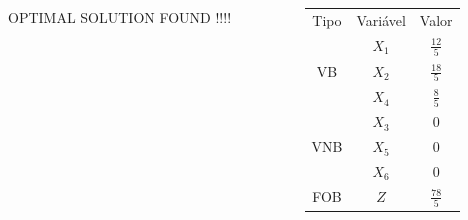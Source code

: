 \documentclass{beamer}
\begin{document}
\begin{frame}
{\begin{columns}
\begin{column}{5cm}
			\end{column}
		\end{columns}
	}	
	{
		\begin{columns}
			\begin{column}{5cm}
				\begin{mdframed}[backgroundcolor=red!80]
					\centering
					OPTIMAL SOLUTION FOUND !!!!
				\end{mdframed}
			\end{column}
			\begin{column}{5cm}
				\begin{table}
					\begin{tabular}{ c | c | c |}
						\hline
						\cellcolor{blue!100} \color{white}\scriptsize Tipo     & 
						\cellcolor{blue!100} \color{white} \scriptsize Variável &  
						\cellcolor{blue!100} \color{white} \scriptsize Valor \\
						\cellcolor{green!80}  & 
						\cellcolor{green!80} $\scriptstyle X_1$   &  
						\cellcolor{green!80} $\scriptstyle \frac{12}{5}$   \\
						\cellcolor{green!80} VB & 
						\cellcolor{green!80} $\scriptstyle X_2$   &  
						\cellcolor{green!80} $\scriptstyle \frac{18}{5}$   \\
						\cellcolor{green!80} & 
						\cellcolor{green!80} $\scriptstyle X_4$   &  
						\cellcolor{green!100} $\scriptstyle \frac{8}{5}$   \\
						\cellcolor{yellow!50} & 
						\cellcolor{yellow!50} $ \scriptstyle X_3$   &  
						\cellcolor{yellow!50} $\scriptstyle 0$   \\
						\cellcolor{yellow!50} VNB & 
						\cellcolor{yellow!50} $\scriptstyle X_5$   &  
						\cellcolor{yellow!50} $\scriptstyle 0$   \\
						\cellcolor{yellow!50} & 
						\cellcolor{yellow!50} $\scriptstyle X_6$   &  
						\cellcolor{yellow!50} $\scriptstyle 0$   \\						
						\cellcolor{green!80} FOB 				 & 
						\cellcolor{green!80} $\scriptstyle Z$     &  
						\cellcolor{green!80} $\scriptstyle \frac{78}{5}$  \\
						\hline		
					\end{tabular}
				\end{table}
			\end{column}
		\end{columns}
	}	
	

\end{frame}

\end{document}
